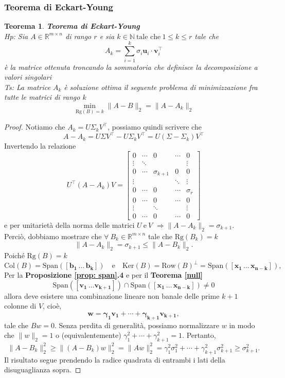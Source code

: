 \documentclass[11pt]{article}
\newtheorem{theorem}{Teorema}
\newcommand{\R}{\mathbb{R}} %
\begin{document}
\subsubsection{Teorema di Eckart-Young}
\begin{theorem}\label{EY}
\textbf{Teorema di Eckart-Young}\\
\textit{Hp:} Sia $A \in \R^{m \times n}$ di rango $r$ e sia $k \in \mathbb{N} \ \text{tale che} \ 1 \leq k \leq r$ tale che $$A_k= \sum_{i=1}^{k} \sigma_i \mathbf{u}_i \cdot \mathbf{v}_i^\top      $$ è la matrice ottenuta troncando la sommatoria che definisce la decomposizione a valori singolari\\
\textit{Ts:} La matrice $A_k$ è soluzione ottima il seguente problema di minimizzazione fra tutte le matrici di rango $k$
\[
\min_{\text{Rg}(B) = k} \|A - B\|_2 = \|A - A_k\|_2
\]
\end{theorem}
\begin{proof}
Notiamo che $A_k = U \Sigma_k V^\top      $, possiamo quindi scrivere che 
\[ A - A_k = U \Sigma V^\top       - U \Sigma_k V^\top       = U (\Sigma - \Sigma_k) V^\top       \]
Invertendo la relazione
\[ U^\top      (A-A_k)V = \begin{bmatrix}
0 & \cdots & 0 & \cdots & 0 \\
\vdots & \ddots & & & \vdots \\
0 & \cdots & \sigma_{k+1} & 0 & 0 \\
\vdots & & & \ddots & \vdots \\
0 & \cdots & 0 & \cdots & \sigma_{r} \\
0 & \cdots & 0 & \cdots & 0 \\
\vdots &  & \ddots & & \vdots \\
0 & \cdots & 0 & \cdots & 0
\end{bmatrix} \]
e per unitarietà della norma delle matrici $U \ \text{e} \ V$ $\Rightarrow \|A-A_k\|_2=\sigma_{k+1}$.\\
Perciò, dobbiamo mostrare che  $\forall \ B_k \in \R^{m \times n}$ tale che $\text{Rg}(B_k)=k$ 
$$
\|A-A_k\|_2 = \sigma_{k+1} \leq \|A-B_k\|_2.
$$
Poiché $\text{Rg}(B)=k$ 
\[
\text{Col}(B) = \text{Span}(\mathbf{[b_1 \, \dots \, b_k]}) \quad \text{e} \quad \text{Ker}(B) =\text{Row}(B)^\perp = \text{Span}(\mathbf{[x_{1} \, \dots \, x_{n-k}]}),
\] 
Per la \textbf{Proposizione \ref{prop: span}.4} e per il \textbf{Teorema \ref{null}}
\[
\text{Span}(\mathbf{[v_1 \, \dots v_{k+1}]}) \cap \text{Span}(\mathbf{[x_{1} \, \dots \, x_{n-k}]}) \neq 0
\]
allora deve esistere una combinazione lineare non banale delle prime $k+1$ colonne di $V$, cioè,
\[
\mathbf{w = \gamma_1v_1 + \cdots + \gamma_{k+1}v_{k+1}},
\]
tale che $Bw = 0$. Senza perdita di generalità, possiamo normalizzare $w$ in modo che $\|w\|_2 = 1$ o (equivalentemente) $\gamma_1^2 + \cdots + \gamma_{k+1}^2 = 1$. Pertanto,
\[
\|A-B_k\|_2^2 \geq \|(A-B_k)w\|_2^2 = \|Aw\|_2^2 = \gamma_1^2\sigma_1^2 + \cdots + \gamma_{k+1}^2\sigma_{k+1}^2 \geq \sigma_{k+1}^2.
\]
Il risultato segue prendendo la radice quadrata di entrambi i lati della disuguaglianza sopra.
\end{proof}
\end{document}
